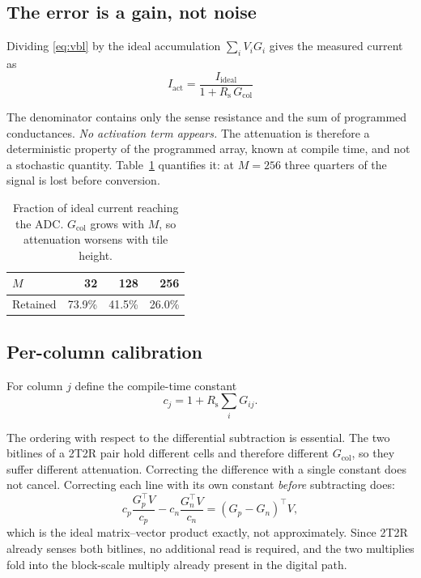 \documentclass[conference,10pt]{IEEEtran}
\newcommand{\Rs}{R_{\mathrm{s}}}
\newcommand{\Gcol}{G_{\mathrm{col}}}
\begin{document}
\subsection{The error is a gain, not noise}

Dividing \eqref{eq:vbl} by the ideal accumulation $\sum_i V_i G_i$ gives the
measured current as
\begin{equation}
\boxed{\;I_{\mathrm{act}} = \frac{I_{\mathrm{ideal}}}{1 + \Rs\,\Gcol}\;}
\label{eq:gain}
\end{equation}

The denominator contains only the sense resistance and the sum of programmed
conductances. \emph{No activation term appears.} The attenuation is therefore
a deterministic property of the programmed array, known at compile time, and
not a stochastic quantity. Table~\ref{tab:retain} quantifies it: at $M{=}256$
three quarters of the signal is lost before conversion.

\begin{table}[t]
\centering
\caption{Fraction of ideal current reaching the ADC. $\Gcol$ grows with $M$,
so attenuation worsens with tile height.}
\label{tab:retain}
\begin{tabular}{lrrr}
\toprule
$M$ & 32 & 128 & 256 \\
\midrule
Retained & 73.9\% & 41.5\% & 26.0\% \\
\bottomrule
\end{tabular}
\end{table}

\subsection{Per-column calibration}

For column $j$ define the compile-time constant
\begin{equation}
c_j = 1 + \Rs \sum_i G_{ij}.
\label{eq:c}
\end{equation}

The ordering with respect to the differential subtraction is essential. The two
bitlines of a 2T2R pair hold different cells and therefore different $\Gcol$,
so they suffer different attenuation. Correcting the difference with a single
constant does not cancel. Correcting each line with its own constant
\emph{before} subtracting does:
\begin{equation}
c_p\frac{G_p^{\!\top}V}{c_p} - c_n\frac{G_n^{\!\top}V}{c_n}
= (G_p - G_n)^{\!\top}V,
\label{eq:collapse}
\end{equation}
which is the ideal matrix--vector product exactly, not approximately. Since
2T2R already senses both bitlines, no additional read is required, and the two
multiplies fold into the block-scale multiply already present in the digital
path.
\end{document}
